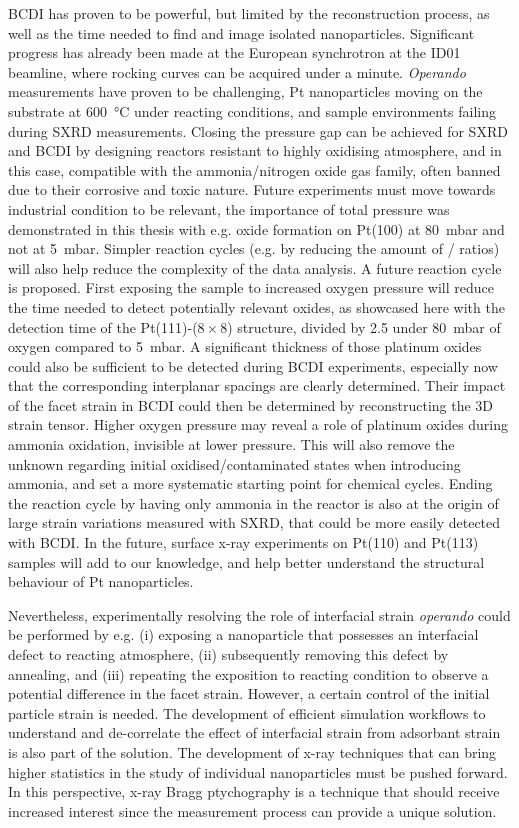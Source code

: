 BCDI has proven to be powerful, but limited by the reconstruction process, as well as the time needed to find and image isolated nanoparticles.
Significant progress has already been made at the European synchrotron at the ID01 beamline, where rocking curves can be acquired under a minute.
\textit{Operando} measurements have proven to be challenging, Pt nanoparticles moving on the substrate at \qty{600}{\degreeCelsius} under reacting conditions, and sample environments failing during SXRD measurements.
Closing the pressure gap can be achieved for SXRD and BCDI by designing reactors resistant to highly oxidising atmosphere, and in this case, compatible with the ammonia/nitrogen oxide gas family, often banned due to their corrosive and toxic nature.
Future experiments must move towards industrial condition to be relevant, the importance of total pressure was demonstrated in this thesis with e.g. oxide formation on Pt(100) at \qty{80}{\milli\bar} and not at \qty{5}{\milli\bar}.
Simpler reaction cycles (e.g. by reducing the amount of / ratios) will also help reduce the complexity of the data analysis.
A future reaction cycle is proposed.
First exposing the sample to increased oxygen pressure will reduce the time needed to detect potentially relevant oxides, as showcased here with the detection time of the Pt(111)-($8\times8$) structure, divided by \num{2.5} under \qty{80}{\milli\bar} of oxygen compared to \qty{5}{\milli\bar}.
A significant thickness of those platinum oxides could also be sufficient to be detected during BCDI experiments, especially now that the corresponding interplanar spacings are clearly determined.
Their impact of the facet strain in BCDI could then be determined by reconstructing the 3D strain tensor.
Higher oxygen pressure may reveal a role of platinum oxides during ammonia oxidation, invisible at lower pressure.
This will also remove the unknown regarding initial oxidised/contaminated states when introducing ammonia, and set a more systematic starting point for chemical cycles.
Ending the reaction cycle by having only ammonia in the reactor is also at the origin of large strain variations measured with SXRD, that could be more easily detected with BCDI.
In the future, surface x-ray experiments on Pt(110) and Pt(113) samples will add to our knowledge, and help better understand the structural behaviour of Pt nanoparticles.

Nevertheless, experimentally resolving the role of interfacial strain \textit{operando} could be performed by e.g. (i) exposing a nanoparticle that possesses an interfacial defect to reacting atmosphere, (ii) subsequently removing this defect by annealing, and (iii) repeating the exposition to reacting condition to observe a potential difference in the facet strain.
However, a certain control of the initial particle strain is needed.
The development of efficient simulation workflows to understand and de-correlate the effect of interfacial strain from adsorbant strain is also part of the solution.
The development of x-ray techniques that can bring higher statistics in the study of individual nanoparticles must be pushed forward.
In this perspective, x-ray Bragg ptychography is a technique that should receive increased interest since the measurement process can provide a unique solution.

